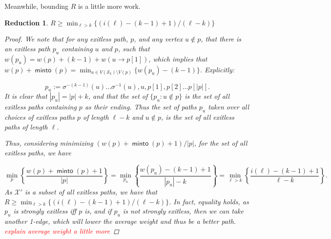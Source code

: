 \documentclass{article}
\newtheorem{red}[result]{Reduction}
\theoremstyle{definition}
\DeclareMathOperator{\minto}{\bm{\mathsf{minto}}}
\newcommand{\hide}[1]{}
\newcommand{\edit}[1]{\textcolor{red}{#1}}
\newcommand{\review}[1]{}%
\newcommand{\dc}[1]{\textcolor{orange}{dc: #1}}
\begin{document}
\vspace{.75em}
Meanwhile, bounding $R$ is a little more work.
\begin{red} $R \geq \min_{\ell > k}\{(i(\ell)-(k-1)+1)/(\ell-k) \}$
\begin{proof}

We note that for any exitless path, $p$, and any vertex $u \not \in p$, that there is an exitless path $p_u$ containing $u$ and $p$, such that $w(p_u) = w(p) + (k-1)+w(u\to p[1])$, which implies that $w(p)+\minto(p) = \min_{u \in V(\mathcal{S}_k) \setminus V(p)}\{w(p_u)-(k-1)\}$. Explicitly: 

\[p_u := \sigma^{-(k-1)}(u)\dots \sigma^{-1}(u), u, p[1],p[2]\dots p[|p|].\]
It is clear that $|p_u| = |p|+k$, and that the set of $\{p_u: u \not \in p\}$ is the set of all exitless paths containing $p$ as their ending. Thus the set of paths $p_u$ taken over all choices of exitless paths $p$ of length $\ell-k$ and $u \not \in p$, is the set of all exitless paths of length $\ell$. 

Thus, considering minimizing $(w(p)+\minto(p)+1)/|p|$, for the set of all exitless paths, we have

\[\min_p\left\{\frac{w(p)+\minto(p)+1}{|p|}\right\} = \min_{p_u}\left\{\frac{w(p_u)-(k-1)+1}{|p_u|-k}\right\} = \min_{\ell > k}\left\{\frac{i(\ell)-(k-1)+1}{\ell-k} \right\}.\]
As $\mathcal{X}'$ is a subset of all exitless paths, we have that $R \geq \min_{\ell > k}\{(i(\ell)-(k-1)+1)/(\ell-k) \}$. In fact, equality holds, as $p_u$ is strongly exitless iff $p$ is, and if $p_u$ is not strongly exitless, then we can take another 1-edge, which will lower the average weight and thus be a better path. \edit{ explain average weight a little more}
\end{proof}
\end{red}
\hide{
Bounding $R$ is a little more work. We note that for $p \in \mathcal{X}'$, and $u \not \in p$, that there is an exitless path $p_u$ containing $u$ and $p$, such that $w(p_u) = w(p) + (k-1)+w(u\to p[1])$, which implies that $w(p)+\minto(p) = \min_{u \in V(\mathcal{S}_k) \setminus V(p)}\{w(p_u)-(k-1)\}$. Specifically: 

\[p_u = \sigma^{-(k-1)}(u)\dots \sigma^{-1}(u), u, p[1],p[2]\dots p[|p|]\]
It is clear that $|p_u| = |p|+k$, and that $\{p_u:\}$ thus we exactly have that $R = \min_{\ell > k}\{(i(\ell)-(k-1)+1)/(\ell-k) \}$.\dc{ explain how you get this last equation.} \review{I added ``exactly'' to clarify that this is sharp, but I think it sounds kinda awkward}

We note since the paths of $X$ are strongly exitless, that we should include the restriction that $\ell$ is divisible by $k$ in our reductions. However, it will never be the case that an $\ell$ not divisible by $k$ will give a smaller value than $\ell+1$, thus the clarification is not really necessary. (the reason why is that taking a 1-edge always lowers your average weight, and thus should always be done, and we can always do so when $\ell$ is not divisible by $k$) \textbf{\edit{too dense; could be explained better}}}
\end{document}
